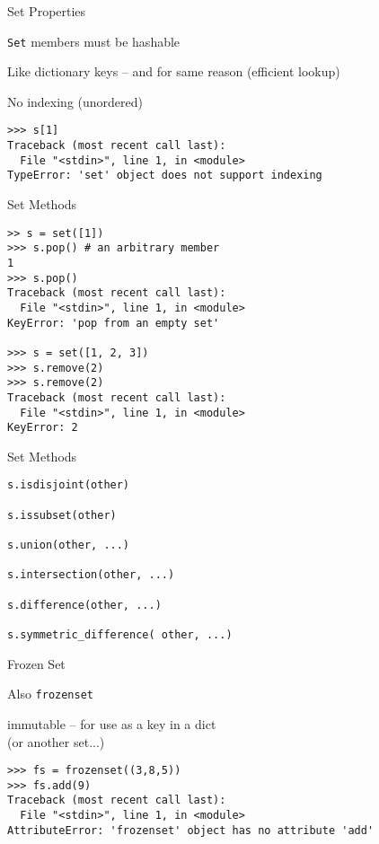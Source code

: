 \documentclass{beamer}
\begin{document}
\begin{frame}[fragile]{ Set Properties}

\vfill
{\Large \verb|Set| members must be hashable}

\vfill
{\Large Like dictionary keys -- and for same reason (efficient lookup)}

\vfill
{\Large No indexing (unordered) }

\vfill
\begin{verbatim}
>>> s[1]
Traceback (most recent call last):
  File "<stdin>", line 1, in <module>
TypeError: 'set' object does not support indexing
\end{verbatim}

\vfill
\end{frame} 

\begin{frame}[fragile]{ Set Methods}

\begin{verbatim}
>> s = set([1])
>>> s.pop() # an arbitrary member
1
>>> s.pop()
Traceback (most recent call last):
  File "<stdin>", line 1, in <module>
KeyError: 'pop from an empty set'

>>> s = set([1, 2, 3])
>>> s.remove(2)
>>> s.remove(2)
Traceback (most recent call last):
  File "<stdin>", line 1, in <module>
KeyError: 2
\end{verbatim}

\vfill
\end{frame} 

\begin{frame}[fragile]{ Set Methods}

\begin{verbatim}
s.isdisjoint(other)

s.issubset(other)

s.union(other, ...)

s.intersection(other, ...)

s.difference(other, ...)

s.symmetric_difference( other, ...)
\end{verbatim}

\vfill
\end{frame} 

\begin{frame}[fragile]{ Frozen Set}

\vfill
{\Large Also \verb|frozenset|}

\vfill
{\Large immutable -- for use as a key in a dict\\
(or another set...)}

\vfill
\begin{verbatim}
>>> fs = frozenset((3,8,5))
>>> fs.add(9)
Traceback (most recent call last):
  File "<stdin>", line 1, in <module>
AttributeError: 'frozenset' object has no attribute 'add'
\end{verbatim}

\vfill
\end{frame} 
\end{document}
